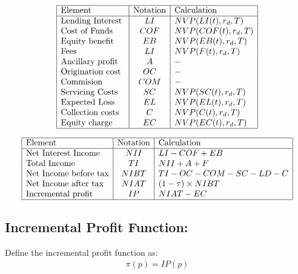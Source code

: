 \renewcommand{\arraystretch}{1.5} %
\begin{center} %
\[ %
\begin{array}{|l|c|l|} \hline %
\mbox{Element} & \mbox{Notation} & \mbox{Calculation}\\ \hline
\mbox{Lending Interest }  & LI & NVP(LI(t),r_d,T)\\
\mbox{Cost of Funds   }  & COF & NVP(COF(t),r_d,T)\\
\mbox{Equity benefit }  & EB & NVP(EB(t),r_d,T)\\
\mbox{Fees }  & LI & NVP(F(t),r_d,T)\\
\mbox{Ancillary profit }  & A & -\\
\mbox{Origination cost}  & OC & -\\
\mbox{Commision  }  & COM & -\\
\mbox{Servicing Costs}  & SC & NVP(SC(t),r_d,T)\\
\mbox{Expected Loss }  & EL & NVP(EL(t),r_d,T)\\
\mbox{Collection costs }  & C & NVP(C(t),r_d,T)\\
\mbox{Equity charge}  & EC & NVP(EC(t),r_d,T)\\

\hline
\end{array} %
\] %
\end{center}

\renewcommand{\arraystretch}{1.5} %
\begin{center} %
\[ %
\begin{array}{|l|c|l|} \hline %
\mbox{Element} & \mbox{Notation} & \mbox{Calculation}\\ \hline
\mbox{Net Interest Income }  & NII & LI-COF+EB\\
\mbox{Total Income  }  & TI & NII+A+F\\
\mbox{Net Income before tax}  & NIBT & TI-OC-COM-SC-LD-C\\
\mbox{Net Income after tax }  & NIAT&(1-\tau)\times NIBT \\
\mbox{Incremental profit  }  & IP & NIAT-EC\\

\hline
\end{array} %
\] %
\end{center}

\subsection{ Incremental Profit Function: }
Define the incremental profit function as:
\begin{align}
\pi(p)=IP(p)
\end{align}
